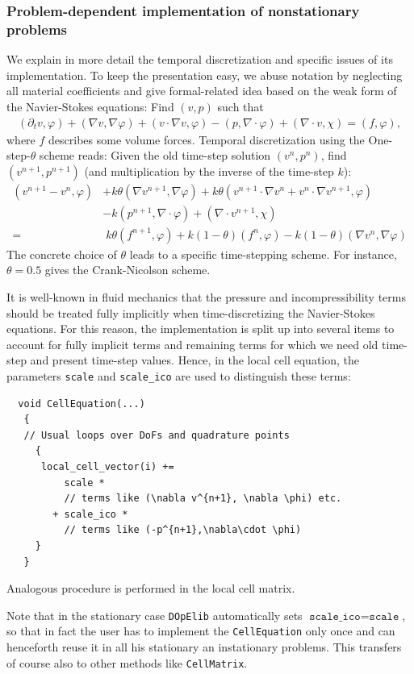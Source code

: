 \documentclass[smallextended]{svjour3}       %
\numberwithin{equation}{section}
\renewcommand{\phi}{\varphi}
\newcommand{\dope}{\texttt{DOpElib}}
\begin{document}
\subsubsection{Problem-dependent 
implementation of nonstationary problems}
\label{sec:timedep:implementation}
We explain in more detail the temporal discretization
and specific issues of its implementation. 
To keep the presentation easy, we abuse notation 
by neglecting
all material coefficients
and give formal-related idea based on the weak 
form of the Navier-Stokes equations:
Find $(v,p)$ such that
\begin{align*}
(\partial_t v,\phi) 
+ (\nabla v, \nabla \phi)
+ (v\cdot\nabla v,\phi)
-(p,\nabla\cdot \phi)
+(\nabla\cdot v, \chi)
=(f,\phi),
\end{align*}
where $f$ describes some volume forces.
Temporal discretization using the One-step-$\theta$ scheme reads:
Given the old time-step solution $(v^n,p^n)$, 
find $(v^{n+1}, p^{n+1})$ (and multiplication 
by the inverse of the time-step $k$):
\begin{align*}
(v^{n+1} - v^{n}, \phi)
&+ k\theta (\nabla v^{n+1}, \nabla \phi)
+ k\theta (v^{n+1}\cdot\nabla v^n + 
  v^{n}\cdot\nabla v^{n+1},\phi)\\
&- k (p^{n+1},\nabla\cdot \phi)
+ (\nabla\cdot v^{n+1}, \chi)\\
=&\; k\theta (f^{n+1},\phi) + k(1-\theta) (f^{n},\phi)
- k(1-\theta) (\nabla v^{n}, \nabla \phi) 
\end{align*}
The concrete choice of $\theta$ leads to a
specific time-stepping scheme. For instance,
$\theta = 0.5$ gives the Crank-Nicolson scheme.

It is well-known in fluid mechanics that the pressure and incompressibility terms should be 
treated fully implicitly when time-discretizing 
the Navier-Stokes equations.
For this reason, the implementation is split up
into several items to account for fully implicit 
terms and remaining terms for which we need 
old time-step and present time-step values. 
Hence, in the local cell equation, the parameters
\texttt{scale} and \texttt{scale\_ico}
are used to distinguish these terms:
\begin{lstlisting}
  void CellEquation(...)
   {
   // Usual loops over DoFs and quadrature points
     {
      local_cell_vector(i) += 
          scale * 
          // terms like (\nabla v^{n+1}, \nabla \phi) etc.
        + scale_ico *
          // terms like (-p^{n+1},\nabla\cdot \phi)
     }
   }
\end{lstlisting}
Analogous procedure is performed in the local 
cell matrix.
\begin{remark}
Note that in the stationary case \dope{} automatically sets $ \texttt{scale\_ico} = \texttt{scale}$, so that in fact the user has to implement the \texttt{CellEquation} only once and can henceforth reuse it in all his stationary an instationary problems. This transfers of course also to other methods like \texttt{CellMatrix}.
\end{remark}
\end{document}
